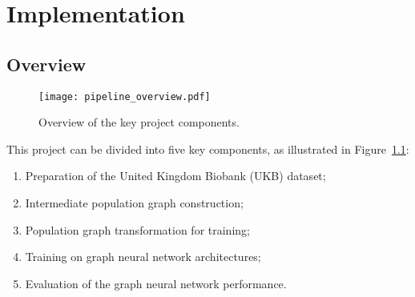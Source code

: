 \chapter{Implementation}
\label{chapter:implementation}


\section{Overview}

\begin{figure}[]
    \centering
    \texttt{[image: pipeline\_overview.pdf]}
    \caption{Overview of the key project components.}\label{pipeline-overview}
\end{figure}

This project can be divided into five key components, as illustrated in Figure~\ref{pipeline-overview}:
\begin{enumerate}
    \item Preparation of the United Kingdom Biobank (UKB) dataset;
    \item Intermediate population graph construction;
    \item Population graph transformation for training;
    \item Training on graph neural network architectures;
    \item Evaluation of the graph neural network performance.
\end{enumerate}


